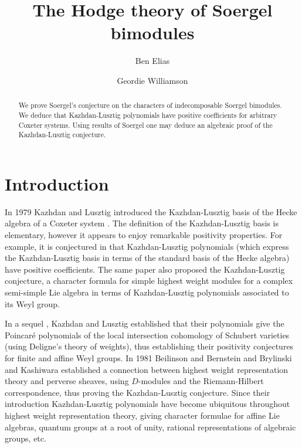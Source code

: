 \documentclass[11pt]{amsart}
\numberwithin{equation}{section}
\theoremstyle{definition}
\theoremstyle{remark}
\begin{document}
\title{The Hodge theory of Soergel bimodules}

\author{Ben Elias}
\address{Massachusetts Institute of Technology, Boston, USA}
\urladdr{}

\author{Geordie Williamson} 
\address{Max-Planck-Institut f\"ur Mathematik, Bonn, Germany}
\urladdr{}

\begin{abstract} We prove Soergel's conjecture on the characters of indecomposable Soergel bimodules. We deduce that Kazhdan-Lusztig polynomials have
positive coefficients for arbitrary Coxeter systems. Using results of
Soergel one may deduce an algebraic proof of the Kazhdan-Lusztig conjecture. \end{abstract}


\maketitle

\tableofcontents

\section{Introduction} \label{sec:introduction}

In 1979 Kazhdan and Lusztig introduced the Kazhdan-Lusztig basis of the Hecke algebra of a Coxeter system \cite{KL1}. The definition of the Kazhdan-Lusztig basis is elementary, however it
appears to enjoy remarkable positivity properties. For example, it is conjectured in \cite{KL1} that Kazhdan-Lusztig polynomials (which express the Kazhdan-Lusztig basis in terms of the
standard basis of the Hecke algebra) have positive coefficients. The same paper also proposed the Kazhdan-Lusztig conjecture, a character formula for simple highest weight modules for a
complex semi-simple Lie algebra in terms of Kazhdan-Lusztig polynomials associated to its Weyl group.

In a sequel \cite{KL2}, Kazhdan and Lusztig established that their polynomials give the Poincar\'e polynomials of the local intersection cohomology of Schubert varieties (using Deligne's
theory of weights), thus establishing their positivity conjectures for
finite and affine Weyl groups. In 1981 Beilinson and Bernstein
\cite{BB} and Brylinski and Kashiwara \cite{BK} established a 
connection between highest weight representation theory and perverse
sheaves, using $D$-modules and the Riemann-Hilbert
correspondence, thus proving the
Kazhdan-Lusztig conjecture. Since their introduction
Kazhdan-Lusztig polynomials have become ubiquitous throughout highest
weight representation theory, giving character formulae for affine Lie
algebras, quantum groups at a root of unity, rational representations
of algebraic groups, etc.
\end{document}
